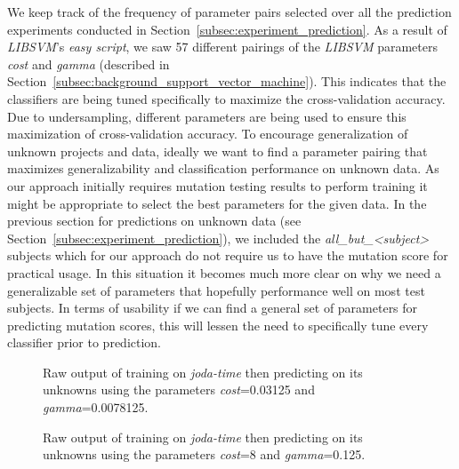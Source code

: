 \noindent
We keep track of the frequency of parameter pairs selected over all the prediction experiments conducted in Section~\ref{subsec:experiment_prediction}. As a result of \emph{LIBSVM}'s \emph{easy script}, we saw 57 different pairings of the \emph{LIBSVM} parameters \emph{cost} and \emph{gamma} (described in Section~\ref{subsec:background_support_vector_machine}). This indicates that the classifiers are being tuned specifically to maximize the cross-validation accuracy. Due to undersampling, different parameters are being used to ensure this maximization of cross-validation accuracy. To encourage generalization of unknown projects and data, ideally we want to find a parameter pairing that maximizes generalizability and classification performance on unknown data. As our approach initially requires mutation testing results to perform training it might be appropriate to select the best parameters for the given data. In the previous section for predictions on unknown data (see Section~\ref{subsec:experiment_prediction}), we included the \emph{all\_but\_<subject>} subjects which for our approach do not require us to have the mutation score for practical usage. In this situation it becomes much more clear on why we need a generalizable set of parameters that hopefully performance well on most test subjects. In terms of usability if we can find a general set of parameters for predicting mutation scores, this will lessen the need to specifically tune every classifier prior to prediction.

\begin{sidewaysfigure}[!tb]
  \centering
  \caption{Raw output of training on \emph{joda-time} then predicting on its unknowns using the parameters \emph{cost}=0.03125 and \emph{gamma}=0.0078125.}
  \label{fig:raw_output_bad}
  \begin{minipage}{.95\textheight}
  \scriptsize{
  
  }
  \end{minipage}
  
  \vspace{3em}

  \centering
  \caption{Raw output of training on \emph{joda-time} then predicting on its unknowns using the parameters \emph{cost}=8 and \emph{gamma}=0.125.}
  \label{fig:raw_output_good}
  \begin{minipage}{.95\textheight}
  \scriptsize{
  
  }
  \end{minipage}
\end{sidewaysfigure}
\afterpage\clearpage

